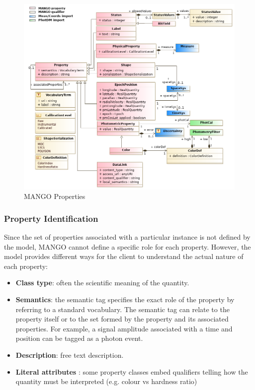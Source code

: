 \documentclass[11pt,a4paper]{ivoa}
\begin{document}
      \begin{figure}[h]
        \includegraphics[width=1.0\textwidth]{../model/property.png}
        \caption{MANGO Properties}
        \label{fig:property}
      \end{figure}

\subsubsection{Property Identification}
Since the set of properties associated with a particular instance is not defined by the model,
MANGO cannot define a specific role for each property. However, the model provides different ways
for the client to understand the actual nature of each property:

\begin{itemize}[noitemsep,topsep=0pt,parsep=0pt,partopsep=0pt]
    \item \textbf{Class type}: often the scientific meaning of the quantity.
    \item \textbf{Semantics}: the semantic tag specifies the exact role of the property by
          referring to a standard vocabulary. The semantic tag can relate to the property itself
          or to the set formed by the property and its associated properties.
          For example, a signal amplitude associated with a time and position can be tagged
          as a photon event.
    \item \textbf{Description}: free text description.
    \item \textbf{Literal attributes} : some property classes embed qualifiers telling 
          how the quantity must be interpreted (e.g. colour vs hardness ratio)
\end{itemize}
\end{document}
